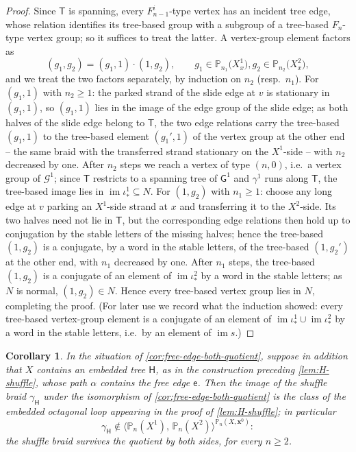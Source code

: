 \documentclass[reqno]{amsart}
\newtheorem{corollary}[theorem]{Corollary}
\theoremstyle{definition}
\newcommand\bfx{\mathbf{x}}
\newcommand\cG{\mathcal{G}}
\newcommand\sfG{\mathsf{G}}
\newcommand\sfT{\mathsf{T}}
\newcommand\sfH{\mathsf{H}}
\newcommand\sfe{\mathsf{e}}
\newcommand{\PB}{\mathbb{P}}
\newcommand{\im}{\operatorname{im}}
\newcommand{\co}[1]{\mathopen{\langle}#1\mathclose{\rangle}} %
\newcommand{\base}{\bfx^0}
\numberwithin{equation}{section}
\begin{document}
\begin{proof}
Since \(\sfT\) is spanning, every \(F^i_{n-1}\)-type vertex has an
incident tree edge, whose relation identifies its tree-based group
with a subgroup of a tree-based \(F_n\)-type vertex group; so it
suffices to treat the latter. A vertex-group element factors as
\[
(g_1,g_2)=(g_1,1)\cdot(1,g_2),\qquad
g_1\in\PB_{n_1}\bigl(X^1_x\bigr),
g_2\in\PB_{n_2}\bigl(X^2_x\bigr),
\]
and we treat the two factors separately, by induction on \(n_2\)
(resp.\ \(n_1\)). For \((g_1,1)\) with \(n_2\geq1\): the parked
strand of the slide edge at \(v\) is stationary in \((g_1,1)\), so
\((g_1,1)\) lies in the image of the edge group of the slide edge;
as both halves of the slide edge belong to \(\sfT\), the two edge
relations carry the tree-based \((g_1,1)\) to the tree-based
element \((g_1',1)\) of the vertex group at the other end -- the
same braid with the transferred strand stationary on the
\(X^1\)-side -- with \(n_2\) decreased by one. After \(n_2\) steps
we reach a vertex of type \((n,0)\), i.e.\ a vertex group of
\(\cG^1\); since \(\sfT\) restricts to a spanning tree of
\(\sfG^1\) and \(\gamma^1\) runs along \(\sfT\), the tree-based
image lies in \(\im\iota^1_\ast\subseteq N\). For \((1,g_2)\) with
\(n_1\geq1\): choose any long edge at \(v\) parking an
\(X^1\)-side strand at \(x\) and transferring it to the
\(X^2\)-side. Its two halves need not lie in \(\sfT\), but the
corresponding edge relations then hold up to conjugation by the
stable letters of the missing halves; hence the tree-based
\((1,g_2)\) is a conjugate, by a word in the stable letters, of
the tree-based \((1,g_2')\) at the other end, with \(n_1\)
decreased by one. After \(n_1\) steps, the tree-based \((1,g_2)\)
is a conjugate of an element of \(\im\iota^2_\ast\) by a word in
the stable letters; as \(N\) is normal, \((1,g_2)\in N\). Hence
every tree-based vertex group lies in \(N\), completing the proof.
(For later use we record what the induction showed: every
tree-based vertex-group element is a conjugate of an element of
\(\im\iota^1_\ast\cup\im\iota^2_\ast\) by a word in the stable
letters, i.e.\ by an element of \(\im s\).)
\end{proof}

\begin{corollary}\label{cor:shuffle-survives-quotient}
In the situation of \cref{cor:free-edge-both-quotient}, suppose
in addition that \(X\) contains an embedded tree \(\sfH\), as in
the construction preceding \cref{lem:H-shuffle}, whose path
\(\alpha\) contains the free edge \(\sfe\). Then the
image of the shuffle braid \(\gamma_\sfH\) under the isomorphism
of \cref{cor:free-edge-both-quotient} is the class of the
embedded octagonal loop appearing in the proof of
\cref{lem:H-shuffle}; in particular
\[
\gamma_\sfH\notin
\co{\PB_n(X^1),\,\PB_n(X^2)}^{\PB_n(X,\base)}:
\]
the shuffle braid survives the quotient by both sides, for every
\(n\geq2\).
\end{corollary}
\end{document}
